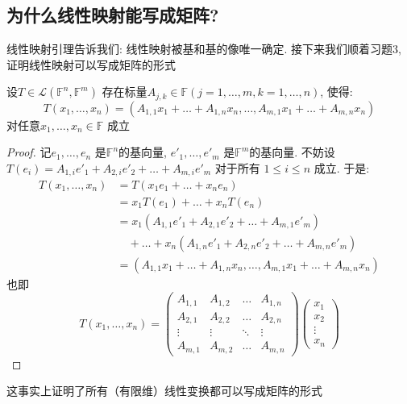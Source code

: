 \subsection{为什么线性映射能写成矩阵?}
线性映射引理告诉我们: 线性映射被基和基的像唯一确定. 接下来我们顺着习题3, 证明线性映射可以写成矩阵的形式
\begin{theorem}
    设\(T \in \mathscr{L}(\mathbb{F}^{n},\mathbb{F}^{m})\)
    存在标量\(A_{j,k} \in
    \mathbb{F} (j = 1, \dots ,m, k=1, \dots, n) \), 使得:
    \[
        T(x_{1},\dots,x_{n})=(A_{1,1}x_{1}+\dots+A_{1,n}x_{n},\dots,A_{m,1}x_{1}+\dots+A_{m,n}x_{n})
    \]
    对任意\(x_{1},\dots,x_{n} \in \mathbb{F}\) 成立
\end{theorem}

\begin{proof}
    记\(e_{1}, \dots, e_{n}\) 是\(\mathbb{F}^{n}\)的基向量,
    \(e'_{1}, \dots, e'_{m}\)
    是\(\mathbb{F}^{m}\)的基向量.
    不妨设 \(T(e_{i}) = A_{1,i}e'_{1} +
        A_{2,i}e'_{2} + \dots +
    A_{m,i}e'_{m}\) 对于所有 \(1\leq i\leq n\) 成立.
    于是:
    \begin{align*}
        T(x_{1},\dots,x_{n}) &= T(x_{1}e_{1} + \dots +
        x_{n}e_{n})\\
        &= x_{1}T(e_{1}) + \dots + x_{n}T(e_{n})\\
        &= x_{1}(A_{1,1}e'_{1} + A_{2,1}e'_{2} +
        \dots + A_{m,1}e'_{m}) \nonumber \\
        &\quad + \dots +
        x_{n}(A_{1,n}e'_{1} + A_{2,n}e'_{2} +
        \dots + A_{m,n}e'_{m})\\    &=
        (A_{1,1}x_{1}+\dots+A_{1,n}x_{n},\dots,A_{m,1}x_{1}+\dots+A_{m,n}x_{n})
    \end{align*}
    也即\[
        T(x_1, \dots, x_n) =
        \begin{pmatrix}
            A_{1,1} & A_{1,2} & \dots & A_{1,n} \\
            A_{2,1} & A_{2,2} & \dots & A_{2,n} \\
            \vdots  & \vdots  & \ddots & \vdots  \\
            A_{m,1} & A_{m,2} & \dots & A_{m,n}
        \end{pmatrix}
        \begin{pmatrix}
            x_1 \\
            x_2 \\
            \vdots \\
            x_n
        \end{pmatrix}
    \]
\end{proof}
这事实上证明了所有（有限维）线性变换都可以写成矩阵的形式

